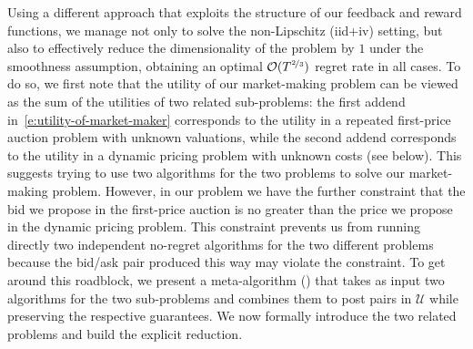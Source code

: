 \documentclass[final,12pt]{colt2025}
\newcommand{\cO}{\mathcal{O}}
\newcommand{\cU}{\mathcal{U}}
\begin{document}
Using a different approach that exploits the structure of our feedback and reward functions, we manage not only to solve the non-Lipschitz (iid+iv) setting, but also to effectively reduce the dimensionality of the problem by $1$ under the smoothness assumption, obtaining an optimal $\cO(T^{\nicefrac{2}{3}})$ regret rate in all cases.
%
%
To do so, we first note that the utility of our market-making problem can be viewed as the sum of the utilities of two related sub-problems: the first addend in~\eqref{e:utility-of-market-maker} corresponds to the utility in a repeated first-price auction problem with unknown valuations, while the second addend corresponds to the utility in a dynamic pricing problem with unknown costs (see below).
This suggests trying to use two algorithms for the two problems to solve our market-making problem.
However, in our problem we have the further constraint that the bid we propose in the first-price auction is no greater than the price we propose in the dynamic pricing problem.
This constraint prevents us from running directly two independent no-regret algorithms for the two different problems because the bid/ask pair produced this way may violate the constraint.
To get around this roadblock, we present a meta-algorithm () that takes as input two algorithms for the two sub-problems and combines them to post pairs in $\cU$ while preserving the respective guarantees.
%
We now formally introduce the two related problems and build the explicit reduction.
\end{document}
